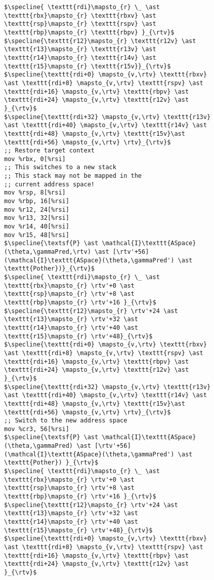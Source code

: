 \begin{figure}
\begin{lstlisting}
$\specline{ \texttt{rdi}\mapsto_{r} \_ \ast \texttt{rbx}\mapsto_{r} \texttt{rbxv} \ast  \texttt{rsp}\mapsto_{r} \texttt{rspv} \ast \texttt{rbp}\mapsto_{r} \texttt{rbpv} }_{\rtv}$
$\specline{\texttt{r12}\mapsto_{r} \texttt{r12v} \ast \texttt{r13}\mapsto_{r} \texttt{r13v} \ast \texttt{r14}\mapsto_{r} \texttt{r14v} \ast \texttt{r15}\mapsto_{r} \texttt{r15v}}_{\rtv}$
$\specline{\texttt{rdi+0} \mapsto_{v,\rtv} \texttt{rbxv} \ast \texttt{rdi+8} \mapsto_{v,\rtv} \texttt{rspv} \ast \texttt{rdi+16} \mapsto_{v,\rtv} \texttt{rbpv} \ast \texttt{rdi+24} \mapsto_{v,\rtv} \texttt{r12v} \ast }_{\rtv}$
$\specline{\texttt{rdi+32} \mapsto_{v,\rtv} \texttt{r13v} \ast \texttt{rdi+40} \mapsto_{v,\rtv} \texttt{r14v} \ast \texttt{rdi+48} \mapsto_{v,\rtv} \texttt{r15v}\ast \texttt{rdi+56} \mapsto_{v,\rtv} \rtv}_{\rtv}$    
;; Restore target context
mov %rbx, 0[%rsi] 
;; This switches to a new stack
;; This stack may not be mapped in the
;; current address space!
mov %rsp, 8[%rsi] 
mov %rbp, 16[%rsi]
mov %r12, 24[%rsi]
mov %r13, 32[%rsi]
mov %r14, 40[%rsi]
mov %r15, 48[%rsi]
$\specline{\textsf{P} \ast \mathcal{I}\texttt{ASpace}(\theta,\gammaPred,\rtv) \ast [\rtv'+56](\mathcal{I}\texttt{ASpace}(\theta,\gammaPred') \ast \texttt{Pother})}_{\rtv}$
$\specline{ \texttt{rdi}\mapsto_{r} \_ \ast \texttt{rbx}\mapsto_{r} \rtv'+0 \ast  \texttt{rsp}\mapsto_{r} \rtv'+8 \ast \texttt{rbp}\mapsto_{r} \rtv'+16 }_{\rtv}$
$\specline{\texttt{r12}\mapsto_{r} \rtv'+24 \ast \texttt{r13}\mapsto_{r} \rtv'+32 \ast \texttt{r14}\mapsto_{r} \rtv'+40 \ast \texttt{r15}\mapsto_{r} \rtv'+48}_{\rtv}$
$\specline{\texttt{rdi+0} \mapsto_{v,\rtv} \texttt{rbxv} \ast \texttt{rdi+8} \mapsto_{v,\rtv} \texttt{rspv} \ast \texttt{rdi+16} \mapsto_{v,\rtv} \texttt{rbpv} \ast \texttt{rdi+24} \mapsto_{v,\rtv} \texttt{r12v} \ast }_{\rtv}$
$\specline{\texttt{rdi+32} \mapsto_{v,\rtv} \texttt{r13v} \ast \texttt{rdi+40} \mapsto_{v,\rtv} \texttt{r14v} \ast \texttt{rdi+48} \mapsto_{v,\rtv} \texttt{r15v}\ast \texttt{rdi+56} \mapsto_{v,\rtv} \rtv}_{\rtv}$
;; Switch to the new address space
mov %cr3, 56[%rsi]
$\specline{\textsf{P} \ast \mathcal{I}\texttt{ASpace}(\theta,\gammaPred) \ast [\rtv'+56](\mathcal{I}\texttt{ASpace}(\theta,\gammaPred') \ast \texttt{Pother}) }_{\rtv}$
$\specline{ \texttt{rdi}\mapsto_{r} \_ \ast \texttt{rbx}\mapsto_{r} \rtv'+0 \ast  \texttt{rsp}\mapsto_{r} \rtv'+8 \ast \texttt{rbp}\mapsto_{r} \rtv'+16 }_{\rtv}$
$\specline{\texttt{r12}\mapsto_{r} \rtv'+24 \ast \texttt{r13}\mapsto_{r} \rtv'+32 \ast \texttt{r14}\mapsto_{r} \rtv'+40 \ast \texttt{r15}\mapsto_{r} \rtv'+48}_{\rtv}$
$\specline{\texttt{rdi+0} \mapsto_{v,\rtv} \texttt{rbxv} \ast \texttt{rdi+8} \mapsto_{v,\rtv} \texttt{rspv} \ast \texttt{rdi+16} \mapsto_{v,\rtv} \texttt{rbpv} \ast  \texttt{rdi+24} \mapsto_{v,\rtv} \texttt{r12v} \ast }_{\rtv}$

\end{lstlisting}
\end{figure}
